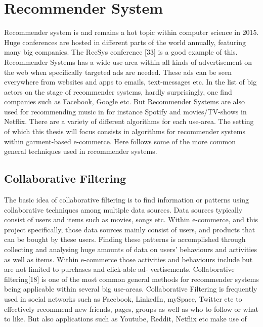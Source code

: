 \chapter{Recommender System}
Recommender system is and remains a hot topic within computer science in 2015. Huge conferences are hosted in different parts of the world annually, featuring many big companies. The RecSys conference [33] is a good example
of this. Recommender Systems has a wide use-area within all kinds of advertisement on the web when specifically targeted ads are needed. These ads can be seen everywhere from websites and apps to emails, text-messages etc. In the list of big actors on the stage of recommender systems, hardly surprisingly, one find companies such as Facebook, Google etc. But Recommender Systems are also used for recommending music in for instance Spotify and movies/TV-shows in Netflix. There are a variety of different algorithms for each use-area. The setting of which this thesis will focus consists
in algorithms for recommender systems within garment-based e-commerce. Here follows some of the more common general techniques used in recommender systems.


\section{Collaborative Filtering}
The basic idea of collaborative filtering is to find information or patterns using collaborative techniques among multiple data sources. Data sources typically consist of users and
items such as movies, songs etc. Within e-commerce, and this project specifically, those
data sources mainly consist of users, and products that can be bought by these users.
Finding these patterns is accomplished through collecting and analysing huge amounts
of data on users’ behaviours and activities as well as items. Within e-commerce those
activities and behaviours include but are not limited to purchases and click-able ad-
vertisements. Collaborative filtering[18] is one of the most common general methods
for recommender systems being applicable within several big use-areas. Collaborative
Filtering is frequently used in social networks such as Facebook, LinkedIn, mySpace,
Twitter etc to effectively recommend new friends, pages, groups as well as who to follow
or what to like. But also applications such as Youtube, Reddit, Netflix etc make use of

